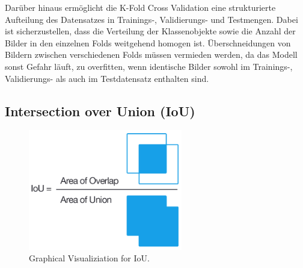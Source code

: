Darüber hinaus ermöglicht die K-Fold Cross Validation eine strukturierte Aufteilung des Datensatzes in Trainings-, Validierungs- und Testmengen. Dabei ist sicherzustellen, dass die Verteilung der Klassenobjekte sowie die Anzahl der Bilder in den einzelnen Folds weitgehend homogen ist. Überschneidungen von Bildern zwischen verschiedenen Folds müssen vermieden werden, da das Modell sonst Gefahr läuft, zu overfitten, wenn identische Bilder sowohl im Trainings-, Validierungs- als auch im Testdatensatz enthalten sind.

\subsection{Intersection over Union (IoU)}

\begin{figure}[h]
    \centering
    \includegraphics[width=0.6\textwidth]{images/Fundamentals/IoU.png}
    \caption{Graphical Visualiziation for IoU. \cite{iou_pic}}
    \label{fig:IoU}
\end{figure}

